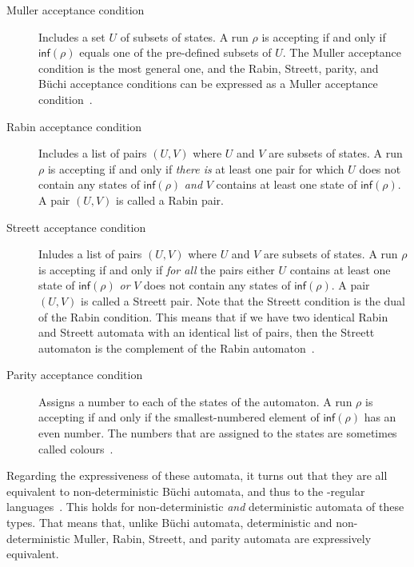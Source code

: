 {
\begin{description}
\item[Muller acceptance condition]
Includes a set $U$ of subsets of states. A run $\rho$ is accepting if and only if $\textsf{inf}(\rho)$ equals one of the pre-defined subsets of $U$. The Muller acceptance condition is the most general one, and the Rabin, Streett, parity, and Büchi acceptance conditions can be expressed as a Muller acceptance condition~\cite{1998_loeding_msc,2014_wilke}.

\item[Rabin acceptance condition]
Includes a list of pairs $(U, V)$ where $U$ and $V$ are subsets of states. A run $\rho$ is accepting if and only if \textit{there is} at least one pair for which $U$ does not contain any states of $\textsf{inf}(\rho)$ \textit{and} $V$ contains at least one state of $\textsf{inf}(\rho)$. A pair $(U, V)$ is called a Rabin pair.

\item[Streett acceptance condition]
Inludes a list of pairs $(U, V)$ where $U$ and $V$ are subsets of states. A run $\rho$ is accepting if and only if \textit{for all} the pairs either $U$ contains at least one state of $\textsf{inf}(\rho)$ \textit{or} $V$ does not contain any states of $\textsf{inf}(\rho)$. A pair $(U, V)$ is called a Streett pair. Note that the Streett condition is the dual of the Rabin condition. This means that if we have two identical Rabin and Streett automata with an identical list of pairs, then the Streett automaton is the complement of the Rabin automaton~\cite{klein2005linear}.

\item[Parity acceptance condition]
Assigns a number to each of the states of the automaton. A run $\rho$ is accepting if and only if the smallest-numbered element of $\textsf{inf}(\rho)$ has an even number. The numbers that are assigned to the states are sometimes called colours~\cite{1999_loeding}.
\end{description}}

Regarding the expressiveness of these automata, it turns out that they are all equivalent to non-deterministic Büchi automata, and thus to the \om-regular languages~\cite{2014_wilke}. This holds for non-deterministic \textit{and} deterministic automata of these types. That means that, unlike Büchi automata, deterministic and non-deterministic Muller, Rabin, Streett, and parity automata are expressively equivalent.

